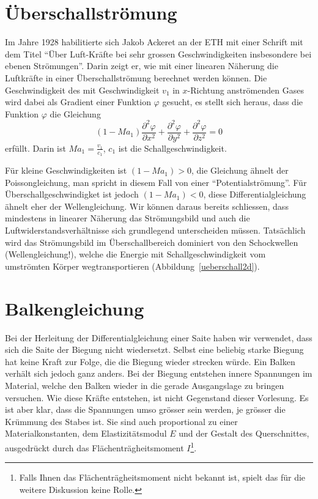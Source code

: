 \section{Überschallströmung \label{beispiele:ueberschall}}
Im Jahre 1928 habilitierte sich Jakob Ackeret an der ETH mit einer
Schrift mit dem Titel ``Über Luft-Kräfte bei sehr grossen
Geschwindigkeiten insbesondere bei ebenen Strömungen''. Darin
zeigt er, wie mit einer linearen Näherung die Luftkräfte
in einer Überschallströmung berechnet werden können.
Die Geschwindigkeit des mit Geschwindigkeit $v_1$ in $x$-Richtung
anströmenden
Gases wird dabei als Gradient einer Funktion $\varphi$ gesucht,
es stellt sich heraus, dass die Funktion $\varphi$ die Gleichung
\[
(1-Ma_1)\frac{\partial^2\varphi}{\partial x^2}
+
\frac{\partial^2\varphi}{\partial y^2}
+
\frac{\partial^2\varphi}{\partial z^2}=0
\]
erfüllt.
Darin ist $Ma_1=\frac{v_1}{c_1}$, $c_1$ ist die Schallgeschwindigkeit.

Für kleine Geschwindigkeiten ist $(1-Ma_1)>0$, die Gleichung ähnelt
der Poissongleichung, man spricht in diesem Fall von einer
``Potentialströmung''.
Für Überschallgeschwindigket ist jedoch $(1-Ma_1) < 0$,
diese Differentialgleichung ähnelt eher der Wellengleichung.
Wir können daraus bereits schliessen, dass mindestens in linearer
Näherung das Strömungsbild und auch die Luftwiderstandsverhältnisse
sich grundlegend unterscheiden müssen.
Tatsächlich wird das Strömungsbild im Überschallbereich dominiert
von den Schockwellen (Wellengleichung!), welche die Energie mit
Schallgeschwindigkeit vom umströmten Körper wegtransportieren
(Abbildung~\ref{ueberschall2d}).

\section{Balkengleichung\label{beispiele:balkengleichung}}
Bei der Herleitung der Differentialgleichung einer Saite haben
wir verwendet, dass sich die Saite der Biegung nicht wiedersetzt.
Selbst eine beliebig starke Biegung hat keine Kraft zur Folge, die
die Biegung wieder strecken würde.
Ein Balken verhält sich jedoch ganz anders. Bei der Biegung entstehen
innere Spannungen im Material, welche den Balken wieder in die
gerade Ausgangslage zu bringen versuchen.
Wie diese Kräfte entstehen, ist nicht Gegenstand dieser Vorlesung.
Es ist aber klar, dass die Spannungen umso grösser sein werden,
je grösser die Krümmung des Stabes ist. Sie sind auch proportional
zu einer Materialkonstanten, dem Elastizitätsmodul $E$ und der
Gestalt des Querschnittes, ausgedrückt durch das Flächenträgheitsmoment
$I$\footnote{Falls Ihnen das Flächenträgheitsmoment nicht bekannt ist,
spielt das für die weitere Diskussion keine Rolle.}.

